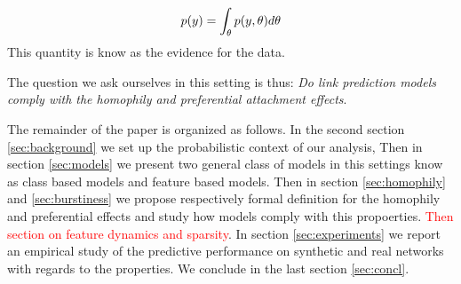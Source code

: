 \begin{equation}
p(y) = \int_{\theta} p(y,\theta) d\theta
\end{equation}
This quantity is know as the evidence for the data.

The question we ask ourselves in this setting is thus: \textit{Do link prediction models comply with the homophily and preferential attachment effects}.


The remainder of the paper is organized as follows. In the second section \ref{sec:background} we set up the probabilistic context of our analysis, Then in section \ref{sec:models} we present two general class of models in this settings know as class based models and feature based models. Then in section \ref{sec:homophily} and \ref{sec:burstiness} we propose respectively formal definition for the homophily and preferential effects and study how models comply with this propoerties. \textcolor{red}{Then section on feature dynamics and sparsity}. In section \ref{sec:experiments} we report an empirical study of the predictive performance on synthetic and real networks with regards to the properties. We conclude in the last section \ref{sec:concl}. 
